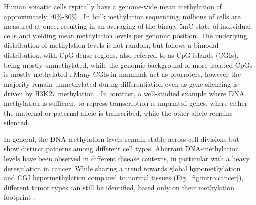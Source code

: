 %
%


Human somatic cells typically have a genome-wide mean methylation of approximately 70\%-80\% \cite{Bird2002}.
In bulk methylation sequencing, millions of cells are measured at once, resulting in an averaging of the binary 5mC state of individual cells and yielding mean methylation levels per genomic position.
The underlying distribution of methylation levels is not random, but follows a bimodal distribution, with CpG dense regions, also referred to as CpG islands (CGIs), being mostly unmethylated, while the genomic background of more isolated CpGs is mostly methylated \cite{Bird2002}.
Many CGIs in mammals act as promoters, however the majority remain unmethylated during differentiation even as gene silencing is driven by H3K27 methylation \cite{Larsen1992, Greenberg2019}.
In contrast, a well-studied example where DNA methylation is sufficient to repress transcription is imprinted genes, where either the maternal or paternal allele is transcribed, while the other allele remains silenced.

In general, the DNA methylation levels remain stable across cell divisions but show distinct patterns among different cell types. 
Aberrant DNA-methylation levels have been observed in different disease contexts, in particular with a heavy deregulation in cancer. 
While sharing a trend towards global hypomethylation and CGI hypermethylation compared to normal tissues (Fig. \ref{fig:intro:cancer}), different tumor types can still be identified, based only on their methylation footprint \cite{Capper2018}.

